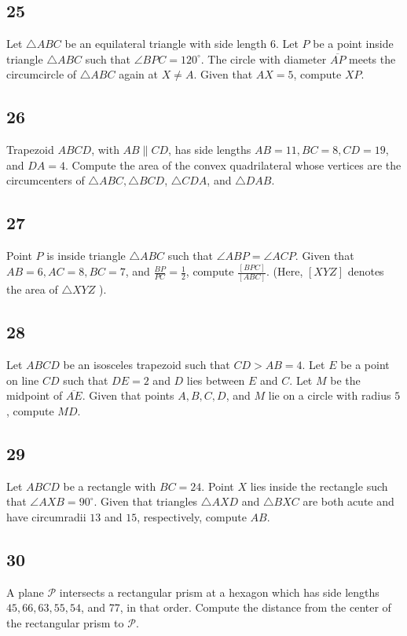 \subsection{25}
Let $\triangle A B C$ be an equilateral triangle with side length $6$. Let $P$ be a point inside triangle $\triangle A B C$ such that $\angle B P C=120^{\circ}$. The circle with diameter $\overline{A P}$ meets the circumcircle of $\triangle A B C$ again at $X \neq A$. Given that $A X=5$, compute $X P$.

\subsection{26}
Trapezoid $A B C D$, with $A B \| C D$, has side lengths $A B=11, B C=8, C D=19$, and $D A=4$. Compute the area of the convex quadrilateral whose vertices are the circumcenters of $\triangle A B C, \triangle B C D$, $\triangle C D A$, and $\triangle D A B$.

\subsection{27}
Point $P$ is inside triangle $\triangle A B C$ such that $\angle A B P=\angle A C P$. Given that $A B=6, A C=8, B C=7$, and $\frac{B P}{P C}=\frac{1}{2}$, compute $\frac{[B P C]}{[A B C]}$.
(Here, $[X Y Z]$ denotes the area of $\triangle X Y Z$ ).

\subsection{28}
Let $A B C D$ be an isosceles trapezoid such that $C D>A B=4$. Let $E$ be a point on line $C D$ such that $D E=2$ and $D$ lies between $E$ and $C$. Let $M$ be the midpoint of $\overline{A E}$. Given that points $A, B, C, D$, and $M$ lie on a circle with radius $5$, compute $M D$.

\subsection{29}
Let $A B C D$ be a rectangle with $B C=24$. Point $X$ lies inside the rectangle such that $\angle A X B=90^{\circ}$. Given that triangles $\triangle A X D$ and $\triangle B X C$ are both acute and have circumradii $13$ and $15$, respectively, compute $A B$.

\subsection{30}
A plane $\mathcal{P}$ intersects a rectangular prism at a hexagon which has side lengths $45,66,63,55,54$, and 77, in that order. Compute the distance from the center of the rectangular prism to $\mathcal{P}$.

